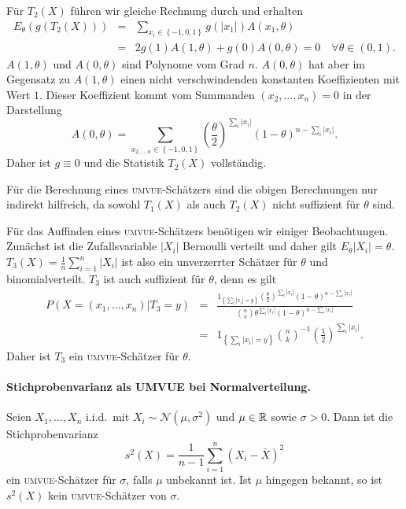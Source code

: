 Für $T_2\left( X \right)$ führen wir gleiche Rechnung durch und erhalten
\begin{eqnarray}
	E_\theta(g\left( T_2\left( X \right) \right)) &=& \sum_{x_i\in\left\{ -1,0,1 \right\}}^{} g(|x_1|) A\left( x_1, \theta \right) \\
	&=& 2 g(1) A(1,\theta) + g(0) A(0,\theta) = 0 \quad \forall\theta\in (0,1).
\end{eqnarray}
$A(1,\theta)$ und $A(0,\theta)$ sind Polynome vom Grad $n$. $A(0,\theta)$ hat aber im Gegensatz zu $A(1,\theta)$ 
einen nicht verschwindenden konstanten Koeffizienten mit Wert $1$. Dieser Koeffizient kommt vom Summanden $(x_2,\ldots,x_n)=0$
in der Darstellung
\begin{equation}
	A(0, \theta) = \sum_{x_{2,\ldots,n}\in\left\{ -1,0,1 \right\}}^{}\left( \frac{\theta}{2} \right)^{\sum_{i}^{} |x_i|}\left( 1-\theta \right)^{n-\sum_{i}^{} |x_i|}.
\end{equation}
Daher ist $g\equiv 0$ und die Statistik $T_2(X)$ vollständig. 

Für die Berechnung eines \textsc{umvue}-Schätzers sind die obigen Berechnungen nur indirekt 
hilfreich, da sowohl $T_1(X)$ als auch $T_2(X)$ nicht suffizient für $\theta$ sind. 

Für das Auffinden eines \textsc{umvue}-Schätzers benötigen wir einiger Beobachtungen. 
Zunächst ist die Zufallsvariable $|X_i|$ Bernoulli verteilt und daher gilt $E_\theta |X_i|=\theta$.
$T_3(X)= \frac{1}{n} \sum_{i=1}^{n} |X_i|$ ist also ein unverzerrter Schätzer für $\theta$ und
binomialverteilt. 
$T_3$ ist auch suffizient für $\theta$, denn es gilt
\begin{eqnarray}
	P( X=\left( x_1,\ldots,x_n \right)| T_3=y) &=& \frac{ 1_{ \left\{ \sum_{i}^{} |x_i|=y \right\} } \left( \frac{\theta}{2} \right)^{\sum_{i}^{} |x_i|}  \left( 1-\theta \right)^{n-\sum_{i}^{} |x_i| }   }{ \binom{n}{k} \theta^{\sum_{i}^{} |x_i|   } (1-\theta)^{n-\sum_{i}^{} |x_i|}        } \\
	&=& 1_{ \left\{ \sum_{i}^{} |x_i|=y \right\} } \binom{n}{k}^{-1} \left( \frac{1}{2} \right)^{\sum_{i}^{} |x_i|}.
\end{eqnarray}
Daher ist $T_3$ ein \textsc{umvue}-Schätzer für $\theta$.





\paragraph{Stichprobenvarianz als UMVUE bei Normalverteilung.} 
Seien $X_1,\ldots,X_n$ i.i.d.\ mit $X_i \sim \mathcal N(\mu,\sigma^2)$ und
$\mu\in\mathbb R$ sowie $\sigma>0$.  Dann ist die Stichprobenvarianz 
\begin{equation*}
	s^2(X) = \frac{1}{n-1} \sum_{i=1}^{n} (X_i - \bar X)^2
\end{equation*}
ein \textsc{umvue}-Schätzer für $\sigma$, falls $\mu$ unbekannt ist. 
Ist $\mu$ hingegen bekannt, so ist $s^2(X)$ kein \textsc{umvue}-Schätzer
von $\sigma$. 

